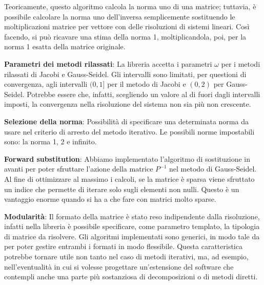 \begin{itemize}
\begin{item}
			Teoricamente, questo algoritmo calcola la norma uno di una matrice; tuttavia, è possibile calcolare la norma uno dell'inversa semplicemente sostituendo le moltiplicazioni matrice per vettore con delle risoluzioni di sistemi lineari. Così facendo, si può ricavare una stima della norma 1, moltiplicandola, poi, per la norma 1 esatta della matrice originale.
			\end{item}
	\begin{item}
		\textbf{Parametri dei metodi rilassati}: La libreria accetta i parametri $\omega$ per i metodi rilassati di Jacobi e Gauss-Seidel. Gli intervalli sono limitati, per questioni di convergenza, agli intervalli $(0, 1]$ per il metodo di Jacobi e $(0, 2)$ per Gauss-Seidel. Potrebbe essere che, infatti, scegliendo un valore al di fuori dagli intervalli imposti, la convergenza nella risoluzione del sistema non sia più non crescente.
	\end{item}
	\begin{item}
		\textbf{Selezione della norma}: Possibilità di specificare una determinata norma da usare nel criterio di arresto del metodo iterativo. Le possibili norme impostabili sono: la norma 1, 2 e infinito.
	\end{item}
	\begin{item}
		\textbf{Forward substitution}: Abbiamo implementato l'algoritmo di sostituzione in avanti per poter sfruttare l'azione della matrice $P^{-1}$ nel metodo di Gauss-Seidel. Al fine di ottimizzare al massimo i calcoli, se la matrice è sparsa viene sfruttato un indice che permette di iterare solo sugli elementi non nulli. Questo è un vantaggio enorme quando si ha a che fare con matrici molto sparse.
	\end{item}
	\begin{item}
		\textbf{Modularità}: Il formato della matrice è stato reso indipendente dalla risoluzione, infatti nella libreria è possibile specificare, come parametro templato, la tipologia di matrice da risolvere. Gli algoritmi implementati sono generici, in modo tale da per poter gestire entrambi i formati in modo flessibile. Questa caratteristica potrebbe tornare utile non tanto nel caso di metodi iterativi, ma, ad esempio, nell'eventualità in cui si volesse progettare un'estensione del software che contempli anche una parte più sostanziosa di decomposizioni o di metodi diretti.
		

\end{item}
\end{itemize}
